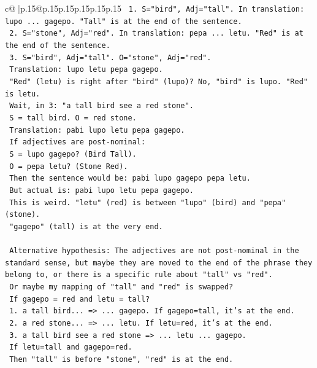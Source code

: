 \documentclass{article}
\begin{document}
{\begin{supertabular}{c@{$\;$}|p{.15\linewidth}@{}p{.15\linewidth}p{.15\linewidth}p{.15\linewidth}p{.15\linewidth}p{.15\linewidth}}
{{{\texttt{   1. S="bird", Adj="tall". In translation: lupo ... gagepo. "Tall" is at the end of the sentence.} \\
\texttt{   2. S="stone", Adj="red". In translation: pepa ... letu. "Red" is at the end of the sentence.} \\
\texttt{   3. S="bird", Adj="tall". O="stone", Adj="red".} \\
\texttt{      Translation: lupo letu pepa gagepo.} \\
\texttt{      "Red" (letu) is right after "bird" (lupo)? No, "bird" is lupo. "Red" is letu.} \\
\texttt{      Wait, in 3: "a tall bird see a red stone".} \\
\texttt{      S = tall bird. O = red stone.} \\
\texttt{      Translation: pabi lupo letu pepa gagepo.} \\
\texttt{      If adjectives are post{-}nominal:} \\
\texttt{      S = lupo gagepo? (Bird Tall).} \\
\texttt{      O = pepa letu? (Stone Red).} \\
\texttt{      Then the sentence would be: pabi lupo gagepo pepa letu.} \\
\texttt{      But actual is: pabi lupo letu pepa gagepo.} \\
\texttt{      This is weird. "letu" (red) is between "lupo" (bird) and "pepa" (stone).} \\
\texttt{      "gagepo" (tall) is at the very end.} \\
\\ 
\texttt{   Alternative hypothesis: The adjectives are not post{-}nominal in the standard sense, but maybe they are moved to the end of the phrase they belong to, or there is a specific rule about "tall" vs "red".} \\
\texttt{   Or maybe my mapping of "tall" and "red" is swapped?} \\
\texttt{   If gagepo = red and letu = tall?} \\
\texttt{   1. a tall bird... => ... gagepo. If gagepo=tall, it's at the end.} \\
\texttt{   2. a red stone... => ... letu. If letu=red, it's at the end.} \\
\texttt{   3. a tall bird see a red stone => ... letu ... gagepo.} \\
\texttt{      If letu=tall and gagepo=red.} \\
\texttt{      Then "tall" is before "stone", "red" is at the end.} \\
}}}
\end{supertabular}}
\end{document}

